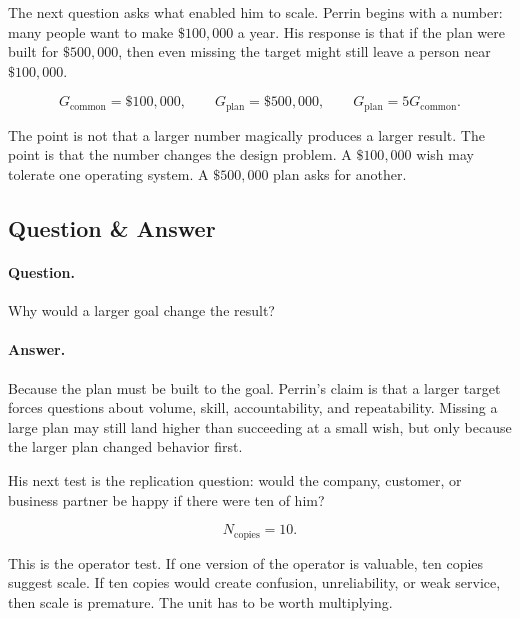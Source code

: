 The next question asks what enabled him to scale. Perrin begins with a number: many people want to make \(\$100{,}000\) a year. His response is that if the plan were built for \(\$500{,}000\), then even missing the target might still leave a person near \(\$100{,}000\).

\begin{equation}
G_{\mathrm{common}}=\$100{,}000,\qquad
G_{\mathrm{plan}}=\$500{,}000,\qquad
G_{\mathrm{plan}}=5G_{\mathrm{common}}.
\end{equation}

The point is not that a larger number magically produces a larger result. The point is that the number changes the design problem. A \(\$100{,}000\) wish may tolerate one operating system. A \(\$500{,}000\) plan asks for another.

\subsection{Question \& Answer}

\paragraph{Question.}
Why would a larger goal change the result?

\paragraph{Answer.}
Because the plan must be built to the goal. Perrin's claim is that a larger target forces questions about volume, skill, accountability, and repeatability. Missing a large plan may still land higher than succeeding at a small wish, but only because the larger plan changed behavior first.

His next test is the replication question: would the company, customer, or business partner be happy if there were ten of him?

\begin{equation}
N_{\mathrm{copies}}=10.
\end{equation}

This is the operator test. If one version of the operator is valuable, ten copies suggest scale. If ten copies would create confusion, unreliability, or weak service, then scale is premature. The unit has to be worth multiplying.

